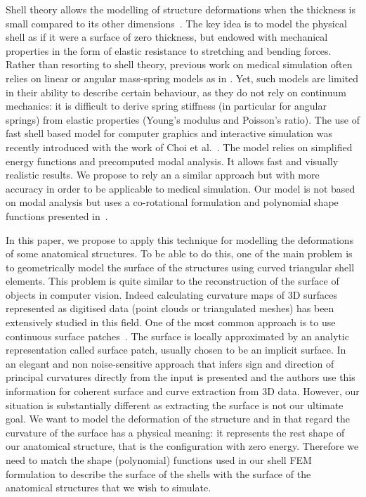 \documentclass{llncs}
\newcommand{\OC}[1]{{\color{blue}{\textbf{OC: #1}}}}
\begin{document}
Shell theory allows the modelling of structure deformations when the thickness is small compared to its other dimensions~\cite{Liu03}. The key idea is to model the physical shell as if it were a surface of zero thickness, but endowed with mechanical properties in the form of elastic resistance to stretching and bending forces. \OC{TODO: reformuler cette phrase pour enlever zero thickness}
Rather than resorting to shell theory, previous work on medical simulation often relies on linear or angular mass-spring models as in \cite{Nedel98,Hammer08}. Yet, such models are limited in their ability to describe certain behaviour, as they do not rely on continuum mechanics: it is difficult to derive spring stiffness (in particular for angular springs) from elastic properties (Young's modulus and Poisson's ratio).
The use of fast shell based model for computer graphics and interactive simulation was recently introduced with the work of Choi et al.~\cite{Choi07}. The model relies on simplified energy functions and precomputed modal analysis. It allows fast and visually realistic results. We propose to rely an a similar approach but with more accuracy in order to be applicable to medical simulation. Our model is not based on modal analysis but uses a co-rotational formulation and polynomial shape functions presented in~\cite{Comas2010ISBMS}.

In this paper, we propose to apply this technique for modelling the deformations of some anatomical structures. To be able to do this, one of the main problem is to geometrically model the surface of the structures using curved triangular shell elements. This problem is quite similar to the reconstruction of the surface of objects in computer vision. Indeed calculating curvature maps of 3D surfaces represented as digitised data (point clouds or triangulated meshes) has been extensively studied in this field. One of the most common approach is to use continuous surface patches~\cite{Kolb95,Douros02}. The surface is locally approximated by an analytic representation called surface patch, usually chosen to be an implicit surface. In~\cite{Tang99} an elegant and non noise-sensitive approach that infers sign and direction of principal curvatures directly from the input is presented and the authors use this information for coherent surface and curve extraction from 3D data. However, our situation is substantially different as extracting the surface is not our ultimate goal. We want to model the deformation of the structure and in that regard the curvature of the surface has a physical meaning: it represents the rest shape of our anatomical structure, that is the configuration with zero energy. Therefore we need to match the shape (polynomial) functions used in our shell FEM formulation to describe the surface of the shells with the surface of the anatomical structures that we wish to simulate.
\end{document}
